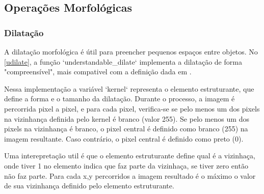 \documentclass[english, 
               brazil, 
               bsc] %
               {dcomp-abntex2}
\begin{document}






\subsection{Operações Morfológicas}
\subsubsection{Dilatação}

 A dilatação morfológica é útil para preencher pequenos espaços entre objetos. No \autoref{udilate}, a função `understandable\_dilate` implementa a dilatação de forma "compreensível", mais compativel com a definição dada em \cite[9.2.2 Dilation]{gonzalez2008digital}.

 Nessa implementação a variável `kernel` representa o elemento estruturante, que define a forma e o tamanho da dilatação. Durante o processo, a imagem é percorrida pixel a pixel, e para cada pixel, verifica-se se pelo menos um dos pixels na vizinhança definida pelo kernel é branco (valor 255). Se pelo menos um dos pixels na vizinhança é branco, o pixel central é definido como branco (255) na imagem resultante. Caso contrário, o pixel central é definido como preto (0).

 Uma interepretação util é que o elemento estruturante define qual é a vizinhaça, onde tiver 1 no elemento indica que faz parte da vizinhaça, se tiver zero então não faz parte. Para cada x,y percorridos a imagem resultado é o máximo o valor de sua vizinhança definido pelo elemento estruturante.
\end{document}
